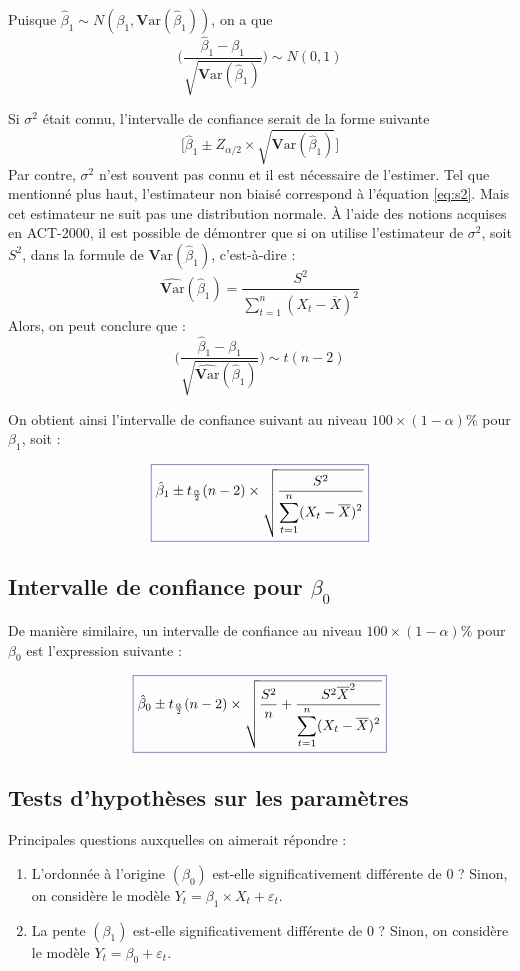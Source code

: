 \documentclass[11pt,french]{report}
\newcommand{\Var}{\mathrm{\textbf{V}ar}}
\begin{document}
\bigskip
Puisque $ \hat{\beta}_1 \sim N(\beta_1, \Var(\hat{\beta}_1))$, on a que 
$$
\Bigg(\frac{\hat{\beta}_1 - \beta_1}{\sqrt{\Var(\hat{\beta}_1)}}\Bigg) \sim N(0,1)
$$

Si $\sigma^2$ était connu, l'intervalle de confiance serait de la forme suivante 
$$
\bigg[\hat{\beta}_1\pm Z_{\alpha/2} \times \sqrt{\Var(\hat{\beta}_1)}\bigg]
$$
Par contre, $\sigma^2$ n'est  souvent pas connu et il est nécessaire de l'estimer. Tel que mentionné plus haut, l'estimateur non biaisé correspond à l'équation \ref{eq:s2}. Mais cet estimateur ne suit pas une distribution normale. À l'aide des notions acquises en ACT-2000, il est possible de démontrer que si on utilise l'estimateur de $\sigma^2$, soit $S^2$, dans la formule de $\Var(\hat{\beta}_1)$, c'est-à-dire :
$$
\widehat{\Var}(\hat{\beta}_1) = \frac{S^2}{\displaystyle\sum_{t=1}^n (X_t - \overline{X})^2}
$$
Alors, on peut conclure que :
$$
\Bigg(\frac{\hat{\beta}_1 - \beta_1}{\sqrt{\widehat{\Var}(\hat{\beta}_1)}}\Bigg) \sim t(n-2)
$$

On obtient ainsi l'intervalle de confiance suivant au niveau $100 \times (1 - \alpha)\%$ pour $\beta_1$, soit :

\begin{equation}
\label{eq:intconfb1}
\color{Blue}
\boxed{\color{black}
\hat{\beta}_1 \pm t_{\frac{\alpha}{2}}(n-2) \times \sqrt{\frac{S^2}{\displaystyle\sum_{t=1}^n (X_t - \overline{X})^2}}}
\end{equation}

\subsection{Intervalle de confiance pour $\beta_0$}
De manière similaire, un intervalle de confiance au niveau $100 \times (1 - \alpha)\%$ pour $\beta_0$ est l'expression suivante :

\begin{equation}
\label{eq:intconfb0}
\color{Blue}
\boxed{\color{black}
\hat{\beta}_0 \pm t_{\frac{\alpha}{2}}(n-2) \times \sqrt{\frac{S^2}{n} + \frac{S^2\overline{X}^2}{\displaystyle\sum_{t=1}^n (X_t - \overline{X})^2}}}
\end{equation}

\subsection{Tests d'hypothèses sur les paramètres}
\label{TestHypo}
Principales questions auxquelles on aimerait répondre :
\begin{enumerate}
\item \label{hyp1} L'ordonnée à l'origine $(\beta_0)$ est-elle significativement différente de 0 ? \newline
Sinon, on considère le modèle $Y_t = \beta_1\times X_t + \varepsilon_t$.
\item  \label{hyp2} La pente $(\beta_1)$ est-elle significativement différente de 0 ? \newline
Sinon, on considère le modèle $Y_t = \beta_0 + \varepsilon_t$.
\end{enumerate}
\end{document}
